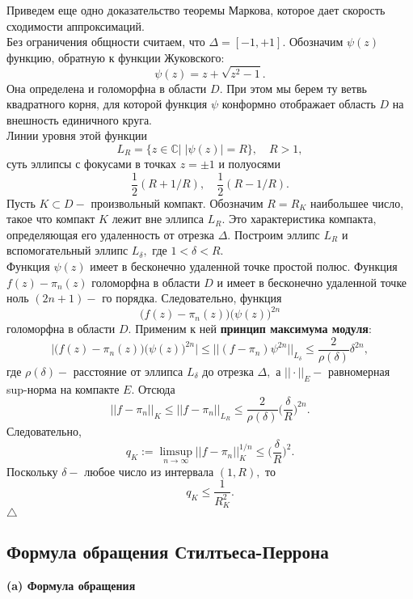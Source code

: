 \documentclass[12pt,a4paper]{article}
\theoremstyle{plain}   \newtheorem{Pro}{Задача}
\begin{document}
Приведем еще одно доказательство теоремы Маркова,
которое дает скорость сходимости аппроксимаций.\\
Без ограничения общности считаем, что
$ \Delta =[-1, +1] . $
Обозначим
$ \psi (z) $
функцию, обратную к функции Жуковского:
$$
  \psi (z)=z+\sqrt{z^2 -1}.
$$
Она определена и голоморфна в области
$ D .$
При этом мы берем ту ветвь квадратного корня, для которой функция
$ \psi $
конформно отображает область
$ D $
на внешность единичного круга.\\
Линии уровня этой функции
$$
  L_R =\{ z \in \mathbb{C} | \; | \psi (z) |=R \} ,
  \quad R>1,
$$
суть эллипсы с фокусами в точках
$ z= \pm 1 $
и полуосями
$$
  \frac{1}{2}(R+1/R), \quad \frac{1}{2}(R-1/R).
$$
Пусть
$ K \subset D - $
произвольный компакт. Обозначим
$ R=R_K $
наибольшее число, такое что компакт
$ K $
лежит вне эллипса
$ L_R . $
Это характеристика компакта, определяющая его удаленность от
отрезка
$ \Delta . $
Построим эллипс
$ L_R $
и вспомогательный эллипс
$ L_{\delta } , $
где
$ 1< \delta <R. $
\\
Функция
$ \psi (z ) $
имеет в бесконечно удаленной точке простой полюс.
Функция
$ f(z)-\pi _n (z) $
голоморфна в области
$ D $
и имеет в бесконечно удаленной точке ноль
$ (2n+1)- $
го порядка. Следовательно, функция
$$
  \bigl ( f(z)-\pi _n (z) \bigr )
  \bigl ( \psi (z) \bigr ) ^{2n}
$$
голоморфна в области
$ D . $
Применим к ней
{\bfseries принцип максимума модуля}:
$$
  \bigl | \bigl ( f(z)-\pi _n (z) \bigr )
  \bigl ( \psi (z) \bigr ) ^{2n} \bigr | \leq
  ||(f-\pi _n )\psi ^{2n}||_{L_{\delta}} \leq
  \frac{2}{\rho (\delta )} \delta ^{2n} ,
$$
где
$ \rho (\delta ) - $
расстояние от эллипса
$ L_{\delta} $
до отрезка
$ \Delta , $
а
$ || \cdot ||_E - $
равномерная sup-норма на компакте
$ E . $
Отсюда
$$
  ||f-\pi _n ||_K \leq ||f-\pi _n ||_{L_R}
  \leq \frac{2}{\rho (\delta )}
  \biggl ( \frac{\delta}{R} \biggr ) ^{2n}.
$$
Следовательно,
$$
  q_K := \limsup _{n \rightarrow \infty}
  ||f-\pi _n ||_K ^{1/n} \leq
  \biggl ( \frac{\delta}{R} \biggr ) ^2 .
$$
Поскольку
$ \delta - $
любое число из интервала
$ (1,R) , $
то
$$
  q_K \leq \frac{1}{R_K ^2}.
$$
$ \triangle $
\newpage
\subsection{Формула обращения Стилтьеса-Перрона}
$ \; $
\\
{\bfseries (a) Формула обращения}\\
\end{document}
